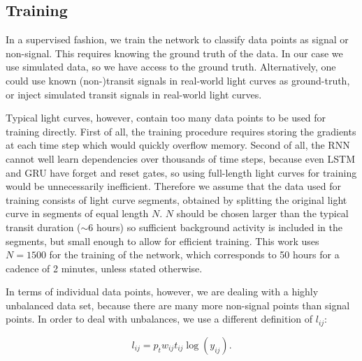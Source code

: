 \subsection{Training}
\label{sec:training}

In a supervised fashion, we train the network to classify data points as signal or non-signal. This requires knowing the ground truth of the data. In our case we use simulated data, so we have access to the ground truth. Alternatively, one could use known (non-)transit signals in real-world light curves as ground-truth, or inject simulated transit signals in real-world light curves. 

Typical light curves, however, contain too many data points to be used for training directly. First of all, the training procedure requires storing the gradients at each time step which would quickly overflow memory. Second of all, the RNN cannot well learn dependencies over thousands of time steps, because even LSTM and GRU have forget and reset gates, so using full-length light curves for training would be unnecessarily inefficient. Therefore we assume that the data used for training consists of light curve segments, obtained by splitting the original light curve in segments of equal length $N$. $N$ should be chosen larger than the typical transit duration ($\sim$6 hours) so sufficient background activity is included in the segments, but small enough to allow for efficient training. This work uses $N=1500$ for the training of the network, which corresponds to 50 hours for a cadence of 2 minutes, unless stated otherwise.



In terms of individual data points, however, we are dealing with a highly unbalanced data set, because there are many more non-signal points than signal points. In order to deal with unbalances, we use a different definition of $l_{ij}$:

\begin{equation}
    l_{ij} = p_t w_{ij} t_{ij} \log( y_{ij} ).
\end{equation}

